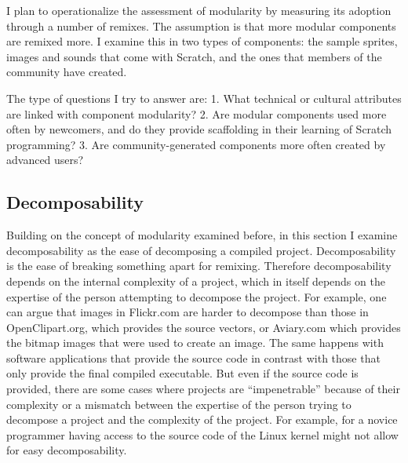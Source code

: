 I plan to operationalize the assessment of modularity by measuring its adoption through a number of remixes.
The assumption is that more modular components are remixed more.
I examine this in two types of components: the sample sprites, images and sounds that come with Scratch, and the ones that members of the community have created.

The type of questions I try to answer are:
1. What technical or cultural attributes are linked with component modularity? 
2. Are modular components used more often by newcomers, and do they provide scaffolding in their learning of Scratch programming?
3. Are community-generated components more often created by advanced users?

\subsection{Decomposability}
Building on the concept of modularity examined before, in this section I examine decomposability as the ease of decomposing a compiled project.
Decomposability is the ease of breaking something apart for remixing.
Therefore decomposability depends on the internal complexity of a project, which in itself depends on the expertise of the person attempting to decompose the project.
For example, one can argue that images in Flickr.com are harder to decompose than those in OpenClipart.org, which provides the source vectors, or Aviary.com which provides the bitmap images that were used to create an image.
The same happens with software applications that provide the source code in contrast with those that only provide the final compiled executable.
But even if the source code is provided, there are some cases where projects are ``impenetrable'' because of their complexity or a mismatch between the expertise of the person trying to decompose a project and the complexity of the project. 
For example, for a novice programmer having access to the source code of the Linux kernel might not allow for easy decomposability.

